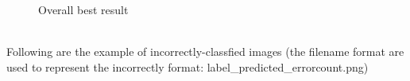\documentclass[11pt, a4paper]{article} %
\begin{document}
\begin{figure}[H]
    \hfill
    \caption{Overall best result}
    \label{fig:my_label}
\end{figure}
\\ Following are the example of incorrectly-classfied images {\small(the filename format are used to represent the incorrectly format: label\_predicted\_errorcount.png)}
\end{document}
